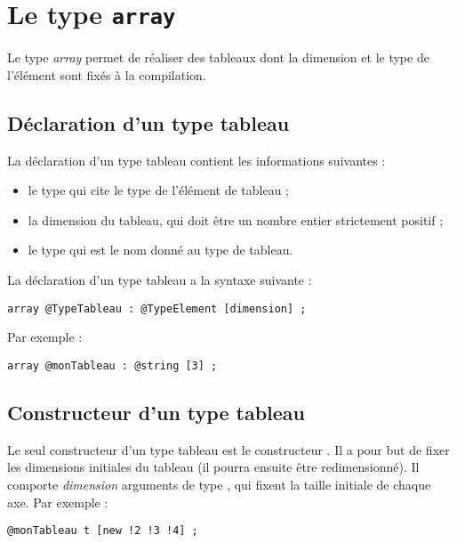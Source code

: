 
\chapter{Le type \texttt{array}}

Le type \emph{array} permet de réaliser des tableaux dont la dimension et le type de l'élément sont fixés à la compilation.

\section{Déclaration d'un type tableau}

La déclaration d'un type tableau contient les informations suivantes :
\begin{itemize}
  \item le type  qui cite le type de l'élément de tableau ;
  \item la dimension du tableau, qui doit être un nombre entier strictement positif ;
  \item le type  qui est le nom donné au type de tableau.
\end{itemize}

La déclaration d'un type tableau a la syntaxe suivante :
\begin{lstlisting}[language=galgas]
array @TypeTableau : @TypeElement [dimension] ;
\end{lstlisting}

Par exemple :
\begin{lstlisting}[language=galgas]
array @monTableau : @string [3] ;
\end{lstlisting}


\section{Constructeur d'un type tableau}

Le seul constructeur d'un type tableau est le constructeur . Il a pour but de fixer les dimensions initiales du tableau (il pourra ensuite être redimensionné). Il comporte \emph{dimension} arguments de type , qui fixent la taille initiale de chaque axe.
Par exemple :
\begin{lstlisting}[language=galgas]
  @monTableau t [new !2 !3 !4] ;
\end{lstlisting}

